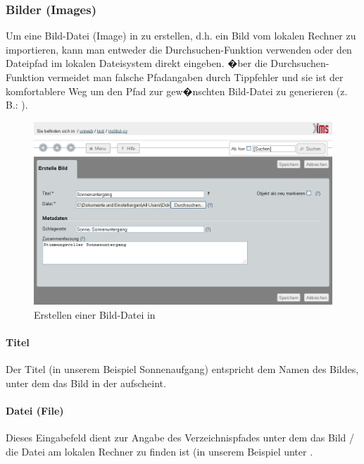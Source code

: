 \subsubsection{Bilder (Images)}
\label{bilder}

Um eine Bild-Datei (Image) in  zu erstellen, d.h. ein Bild vom lokalen Rechner zu importieren, kann man entweder die Durchsuchen-Funktion
verwenden oder den Dateipfad im lokalen Dateisystem direkt eingeben. �ber die
Durchsuchen-Funktion vermeidet man falsche Pfadangaben durch Tippfehler und
sie ist der komfortablere Weg um den Pfad zur gew�nschten Bild-Datei zu
generieren (z.\,B.: ).

\begin{figure}[!ht]
  \centering
  \includegraphics[width=\textwidth]{./images/create-image.png}
  \caption{Erstellen einer Bild-Datei in }
  \label{fig:erstellebild}
\end{figure}

\paragraph{Titel}
Der Titel (in unserem Beispiel Sonnenaufgang) entspricht dem Namen des Bildes,
unter dem das Bild in der  aufscheint.

\paragraph{Datei (File)}
\label{datei}
Dieses Eingabefeld dient zur Angabe des Verzeichnispfades unter dem das Bild / die Datei am lokalen
Rechner zu finden ist (in unserem Beispiel unter .

